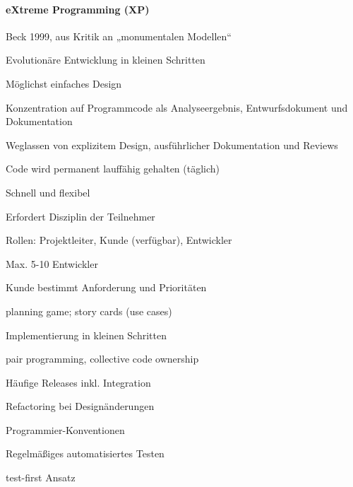 \documentclass[a4paper]{article}
\begin{document}
\begin{multicols}{3}
  \paragraph{eXtreme Programming (XP)}
  \begin{itemize*}
    \item Beck 1999, aus Kritik an „monumentalen Modellen“
    \item Evolutionäre Entwicklung in kleinen Schritten
          \begin{itemize*}
            \item Möglichst einfaches Design
          \end{itemize*}
    \item Konzentration auf Programmcode als Analyseergebnis, Entwurfsdokument und Dokumentation
    \item Weglassen von explizitem Design, ausführlicher Dokumentation und Reviews
    \item Code wird permanent lauffähig gehalten (täglich)
    \item Schnell und flexibel
    \item Erfordert Disziplin der Teilnehmer
    \item Rollen: Projektleiter, Kunde (verfügbar), Entwickler
          \begin{itemize*}
            \item Max. 5-10 Entwickler
          \end{itemize*}
    \item Kunde bestimmt Anforderung und Prioritäten
          \begin{itemize*}
            \item planning game; story cards (use cases)
          \end{itemize*}
    \item Implementierung in kleinen Schritten
          \begin{itemize*}
            \item pair programming, collective code ownership
            \item Häufige Releases inkl. Integration
            \item Refactoring bei Designänderungen
            \item Programmier-Konventionen
          \end{itemize*}
    \item Regelmäßiges automatisiertes Testen
          \begin{itemize*}
            \item test-first Ansatz

\end{itemize*}
\end{itemize*}
\end{multicols}
\end{document}
